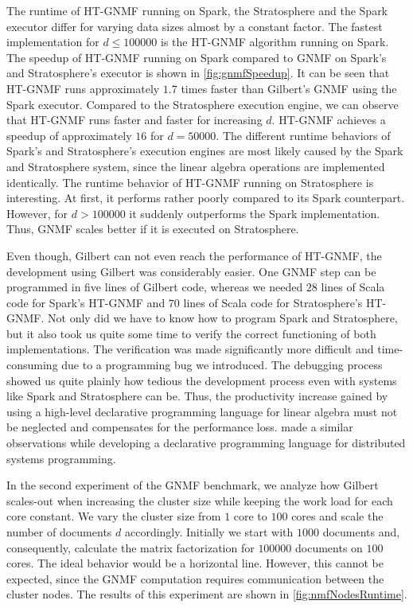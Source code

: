 The runtime of HT-GNMF running on Spark, the Stratosphere and the Spark executor differ for varying data sizes almost by a constant factor.
The fastest implementation for $d\le 100000$ is the HT-GNMF algorithm running on Spark.
The speedup of HT-GNMF running on Spark compared to GNMF on Spark's and Stratosphere's executor is shown in \cref{fig:gnmfSpeedup}.
It can be seen that HT-GNMF runs approximately $1.7$ times faster than Gilbert's GNMF using the Spark executor.
Compared to the Stratosphere execution engine, we can observe that HT-GNMF runs faster and faster for increasing $d$.
HT-GNMF achieves a speedup of approximately $16$ for $d=50000$.
The different runtime behaviors of Spark's and Stratosphere's execution engines are most likely caused by the Spark and Stratosphere system, since the linear algebra operations are implemented identically.
The runtime behavior of HT-GNMF running on Stratosphere is interesting.
At first, it performs rather poorly compared to its Spark counterpart.
However, for $d>100000$ it suddenly outperforms the Spark implementation.
Thus, GNMF scales better if it is executed on Stratosphere. 

Even though, Gilbert can not even reach the performance of HT-GNMF, the development using Gilbert was considerably easier.
One GNMF step can be programmed in five lines of Gilbert code, whereas we needed $28$ lines of Scala code for Spark's HT-GNMF and $70$ lines of Scala code for Stratosphere's HT-GNMF.
Not only did we have to know how to program Spark and Stratosphere, but it also took us quite some time to verify the correct functioning of both implementations.
The verification was made significantly more difficult and time-consuming due to a programming bug we introduced.
The debugging process showed us quite plainly how tedious the development process even with systems like Spark and Stratosphere can be.
Thus, the productivity increase gained by using a high-level declarative programming language for linear algebra must not be neglected and compensates for the performance loss.
\Textcite{alvaro:2010a} made a similar observations while developing a declarative programming language for distributed systems programming.

In the second experiment of the GNMF benchmark, we analyze how Gilbert scales-out when increasing the cluster size while keeping the work load for each core constant.
We vary the cluster size from $1$ core to $100$ cores and scale the number of documents $d$ accordingly.
Initially we start with $1000$ documents and, consequently, calculate the matrix factorization for $100000$ documents on $100$ cores.
The ideal behavior would be a horizontal line.
However, this cannot be expected, since the GNMF computation requires communication between the cluster nodes.
The results of this experiment are shown in \cref{fig:nmfNodesRuntime}.

